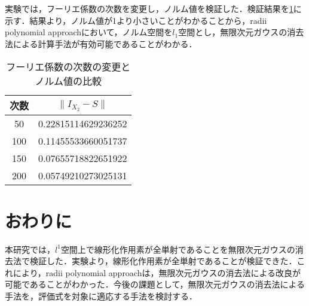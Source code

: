 \documentclass[a4paper,10pt,twocolumn]{jsarticle}
\newcommand{\rad}{radii polynomial approach}
\begin{document}
実験では，フーリエ係数の次数を変更し，ノルム値を検証した．検証結果を\cref{tab:norm-num}に示す．結果より，ノルム値が1より小さいことがわかることから，\rad{}において，ノルム空間を$l_1$空間とし，無限次元ガウスの消去法による計算手法が有効可能であることがわかる．
\begin{table}[htbp]
  \centering
  \caption{フーリエ係数の次数の変更とノルム値の比較}
  \label{tab:norm-num}
  \begin{tabular}{c||c}
    次数 & $\| I_{X_2}-S \|$ \\ \hline
    50 & 0.22815114629236252 \\
    100&0.11455533660051737\\
    150&0.07655718822651922\\
    200&0.05749210273025131
\end{tabular}
\end{table}

\vspace{-1mm}
\section{おわりに}
\vspace{-1mm}
本研究では，$l^1$空間上で線形化作用素が全単射であることを無限次元ガウスの消去法で検証した．実験より，線形化作用素が全単射であることが検証できた．これにより，\rad{}は，無限次元ガウスの消去法による改良が可能であることがわかった．今後の課題として，無限次元ガウスの消去法による手法を，評価式を対象に適応する手法を検討する．

\vspace{-1mm}

{\footnotesize

}
\end{document}
